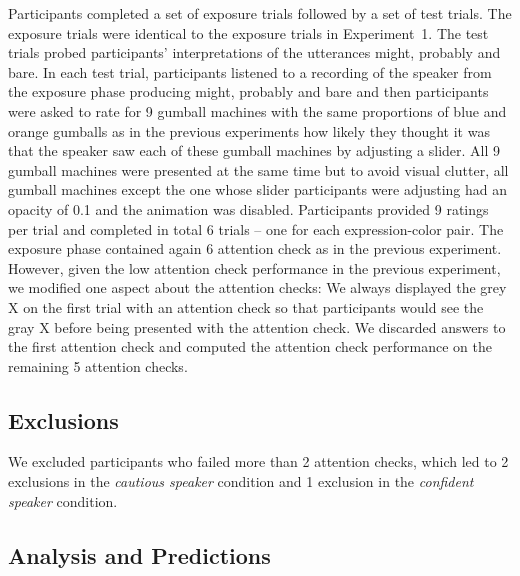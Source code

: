 \documentclass[lucida,biblatex]{sp} %
\begin{document}
Participants completed a set of exposure trials followed by a set of test trials. The exposure trials were identical to the exposure trials in Experiment~1. The test trials probed participants' interpretations of the utterances {\sc might}, {\sc probably} and {\sc bare}. In each test trial, participants listened to a recording of the speaker from the exposure phase producing {\sc might}, {\sc probably} and {\sc bare} and then participants were asked to rate for 9 gumball machines with the same proportions of blue and orange gumballs as in the previous experiments how likely they thought it was that the speaker saw each of these gumball machines by adjusting a slider. All 9 gumball machines were presented at the same time but to avoid visual clutter, all gumball machines except the one whose slider participants were adjusting had an opacity of 0.1 and the animation was disabled. Participants provided 9 ratings per trial and completed in total 6 trials -- one for each expression-color pair. The exposure phase contained again 6 attention check as in the previous experiment. However, given the low attention check performance in the previous experiment, we modified one aspect about the attention checks: We always displayed the grey X on the first trial with an attention check so that participants would see the gray X before being presented with the attention check. We discarded answers to the first attention check and computed the attention check performance on the remaining 5 attention checks.

\subsection{Exclusions}

We excluded participants who failed more than 2 attention checks, which led to 2 exclusions in the \emph{cautious speaker} condition and 1 exclusion in the \emph{confident speaker} condition.


\subsection{Analysis and Predictions}
\end{document}
